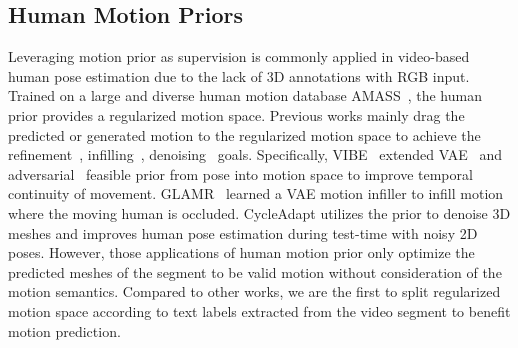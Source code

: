 \subsection{Human Motion Priors}
Leveraging motion prior as supervision is commonly applied in video-based human pose estimation due to the lack of 3D annotations with RGB input. Trained on a large and diverse human motion database AMASS~\cite{mahmood2019amass, human36m}, the human prior provides a regularized motion space. Previous works mainly drag the predicted or generated motion to the regularized motion space to achieve the refinement~\cite{vibe, shin2023wham, rempe2021humor}, infilling~\cite{yuan2022glamr,zhang2021learning}, denoising~\cite{cycleadapt} goals. Specifically,  
VIBE~\cite{vibe} extended VAE~\cite{simplifyx} and adversarial~\cite{hmrnet} feasible prior from pose into motion space to improve temporal continuity of movement. GLAMR~\cite{yuan2022glamr} learned a VAE motion infiller to infill motion where the moving human is occluded. CycleAdapt utilizes the prior to denoise 3D meshes and improves human pose estimation during test-time with noisy 2D poses. 
However, those applications of human motion prior only optimize the predicted meshes of the segment to be valid motion {without consideration of the motion semantics.} Compared to other works, we are the first to split regularized motion space according to text labels extracted from the video segment to benefit motion prediction.
